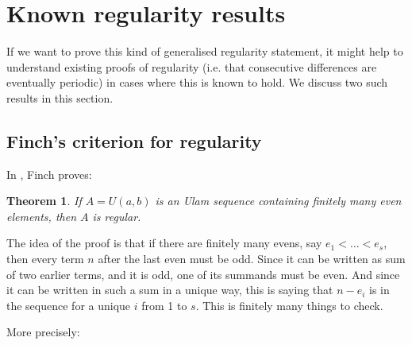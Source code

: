 \documentclass{report}
\newtheorem{theorem}{Theorem}[section]
\theoremstyle{remark}
\numberwithin{equation}{section}
\begin{document}
\section{Known regularity results}

If we want to prove this kind of generalised regularity statement, it
might help to understand existing proofs of regularity (i.e. that
consecutive differences are eventually periodic) in cases where this
is known to hold.  We discuss two such results in this section.

\subsection{Finch's criterion for regularity}

In \cite{finch:em1992}, Finch proves:

\begin{theorem}
  If $A = U(a,b)$ is an Ulam sequence containing finitely many even
  elements, then $A$ is regular.
\end{theorem}

The idea of the proof is that if there are finitely many evens, say
$e_1 < \ldots < e_s$, then every term $n$ after the last even must be
odd.  Since it can be written as sum of two earlier terms, and it is
odd, one of its summands must be even.  And since it can be written in
such a sum in a unique way, this is saying that $n - e_i$ is in the
sequence for a unique $i$ from 1 to $s$.  This is finitely many things
to check.

More precisely:
\end{document}
